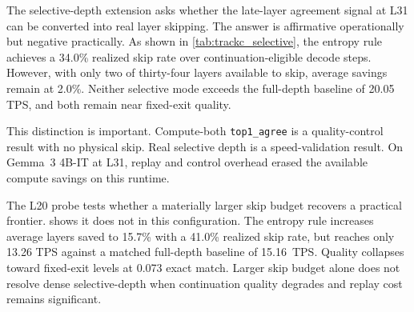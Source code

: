 \documentclass[11pt]{article}
\begin{document}
The selective-depth extension asks whether the late-layer agreement signal at L31 can be converted into real layer skipping. The answer is affirmative operationally but negative practically. As shown in \cref{tab:trackc_selective}, the entropy rule achieves a 34.0\% realized skip rate over continuation-eligible decode steps. However, with only two of thirty-four layers available to skip, average savings remain at 2.0\%. Neither selective mode exceeds the full-depth baseline of 20.05 TPS, and both remain near fixed-exit quality.

This distinction is important. Compute-both \texttt{top1\_agree} is a quality-control result with no physical skip. Real selective depth is a speed-validation result. On Gemma~3 4B-IT at L31, replay and control overhead erased the available compute savings on this runtime.

\begin{table}[t]
\centering
\small
\caption{Selective-depth probe at L20, testing whether a larger skip budget recovers a practical frontier.}
\label{tab:trackc_selective_l20}
\end{table}

The L20 probe tests whether a materially larger skip budget recovers a practical frontier.  shows it does not in this configuration. The entropy rule increases average layers saved to 15.7\% with a 41.0\% realized skip rate, but reaches only 13.26 TPS against a matched full-depth baseline of 15.16~TPS. Quality collapses toward fixed-exit levels at 0.073 exact match. Larger skip budget alone does not resolve dense selective-depth when continuation quality degrades and replay cost remains significant.
\end{document}
